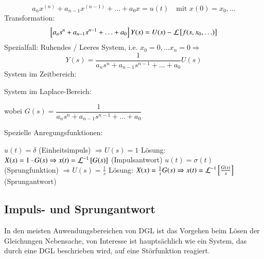\begin{equation*}
    a_nx^{(n)} + a_{n-1}x^{(n-1)}+\ldots+a_0x = u(t) 
    \hspace{1em} \text{mit } x(0)=x_0,\ldots
\end{equation*}
Transformation:
\begin{equation*}
    \left[ a_ns^n+a_{n-1}s^{n-1}+\ldots+a_0 \right]Y(s) = U(s) 
        - \mathcal{L}\left[ f(s,x_0,\ldots) \right]
\end{equation*}
Spezialfall: Ruhendes / Leeres System, i.e. $x_0=0,\ldots x_n=0\Rightarrow$
\begin{equation*}
    Y(s) = \frac{1}{a_ns^n+a_{n-1}s^{n-1}+\ldots+a_0}U(s) 
\end{equation*}
System im Zeitbereich:
\begin{center}
\end{center}
System im Laplace-Bereich:
\begin{center}
\end{center}
wobei $G(s) = \dfrac{1}{a_ns^n+a_{n-1}s^{n-1}+\ldots+a_0}$

Spezielle Anregungsfunktionen:
\begin{outline}
    \1 $u(t) = \delta$ (Einheitsimpuls) $\Rightarrow U(s)=1$
    \2[] Lösung: $X(s) = 1\cdot G(s)\Rightarrow x(t)=\mathcal{L}^{-1}\left[ G(s) \right]$
        (Impulsantwort)
    \1 $u(t) = \sigma(t)$ (Sprungfunktion) $\Rightarrow U(s) = \frac{1}{s}$
    \2[] Lösung: $X(x) = \frac{1}{s} G(s)\Rightarrow x(t)=\mathcal{L}^{-1}\left[
        \frac{G(s)}{s} \right]$ (Sprungantwort)
\end{outline}

\subsection{Impuls- und Sprungantwort}
In den meisten Anwendungsbereichen von DGL ist das Vorgehen beim Lösen der
Gleichungen Nebensache, von Interesse ist hauptsächlich wie ein System, das
durch eine DGL beschrieben wird, auf eine Störfunktion reagiert.

